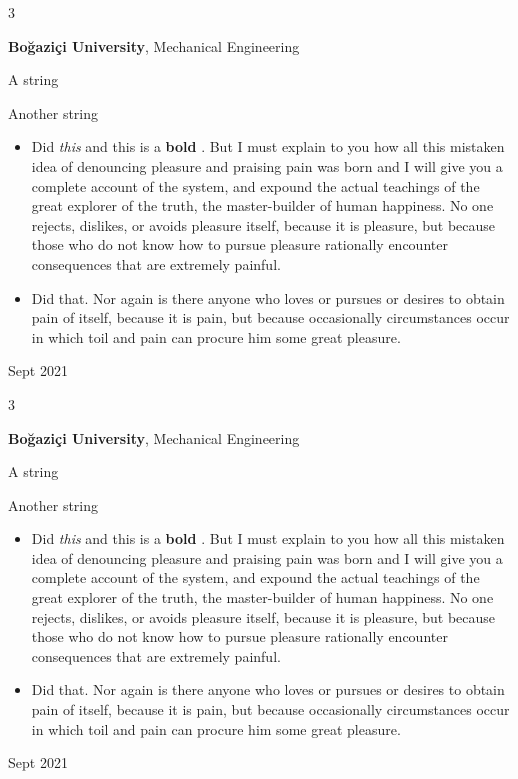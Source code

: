 \documentclass[10pt, letterpaper]{article}
\newenvironment{summary}{
    \begin{description}[
        topsep=0.10 cm,
        parsep=0.10 cm,
        partopsep=0pt,
        itemsep=0pt,
        leftmargin=0.4 cm + 10pt
    ]
}{
    \end{description}
} %
\newenvironment{highlights}{
    \begin{itemize}[
        topsep=0.10 cm,
        parsep=0.10 cm,
        partopsep=0pt,
        itemsep=0pt,
        leftmargin=0.4 cm + 10pt
    ]
}{
    \end{itemize}
} %
\newenvironment{threecolentry}[3][]{
    \onecolentry
    \def\thirdColumn{#3}
    \setcolumnwidth{1 cm, \fill, 4.5 cm}
    \begin{paracol}{3}
    {\raggedright #2} \switchcolumn
}{
    \switchcolumn \raggedleft \thirdColumn
    \end{paracol}
    \endonecolentry
} %
\let\hrefWithoutArrow\href
\renewcommand{\href}[2]{\hrefWithoutArrow{#1}{\ifthenelse{\equal{#2}{}}{ }{#2 }\raisebox{.15ex}{\footnotesize \faExternalLink*}}}
\begin{document}
        \begin{threecolentry}{\textbf{}}{
            Sept 2021
        }
            \textbf{Boğaziçi University}, Mechanical Engineering
            \begin{summary}
                \item A string
                \item Another string
            \end{summary}
            \begin{highlights}
                \item Did \textit{this} and this is a \textbf{bold} \href{https://example.com}{link}. But I must explain to you how all this mistaken idea of denouncing pleasure and praising pain was born and I will give you a complete account of the system, and expound the actual teachings of the great explorer of the truth, the master-builder of human happiness. No one rejects, dislikes, or avoids pleasure itself, because it is pleasure, but because those who do not know how to pursue pleasure rationally encounter consequences that are extremely painful.
                \item Did that. Nor again is there anyone who loves or pursues or desires to obtain pain of itself, because it is pain, but because occasionally circumstances occur in which toil and pain can procure him some great pleasure.
            \end{highlights}
        \end{threecolentry}

        \vspace{0.2 cm}

        \begin{threecolentry}{\textbf{}}{
            Sept 2021
        }
            \textbf{Boğaziçi University}, Mechanical Engineering
            \begin{summary}
                \item A string
                \item Another string
            \end{summary}
            \begin{highlights}
                \item Did \textit{this} and this is a \textbf{bold} \href{https://example.com}{link}. But I must explain to you how all this mistaken idea of denouncing pleasure and praising pain was born and I will give you a complete account of the system, and expound the actual teachings of the great explorer of the truth, the master-builder of human happiness. No one rejects, dislikes, or avoids pleasure itself, because it is pleasure, but because those who do not know how to pursue pleasure rationally encounter consequences that are extremely painful.
                \item Did that. Nor again is there anyone who loves or pursues or desires to obtain pain of itself, because it is pain, but because occasionally circumstances occur in which toil and pain can procure him some great pleasure.
            \end{highlights}
        \end{threecolentry}
\end{document}
